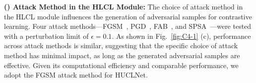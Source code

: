 \textbf{() Attack Method in the HLCL Module:} The choice of attack method in the HLCL module influences the generation of adversarial samples for contrastive learning. Four attack methods—FGSM~\cite{GoodfellowSS14}, PGD~\cite{MadryMSTV18}, FAB~\cite{Croce020}, and SPSA~\cite{SPSA}—were tested with a perturbation limit of $\epsilon = 0.1$. As shown in Fig.~\ref{fig:C4-1} (c), performance across attack methods is similar, suggesting that the specific choice of attack method has minimal impact, as long as the generated adversarial samples are effective. Given its computational efficiency and comparable performance, we adopt the FGSM attack method for HUCLNet.

